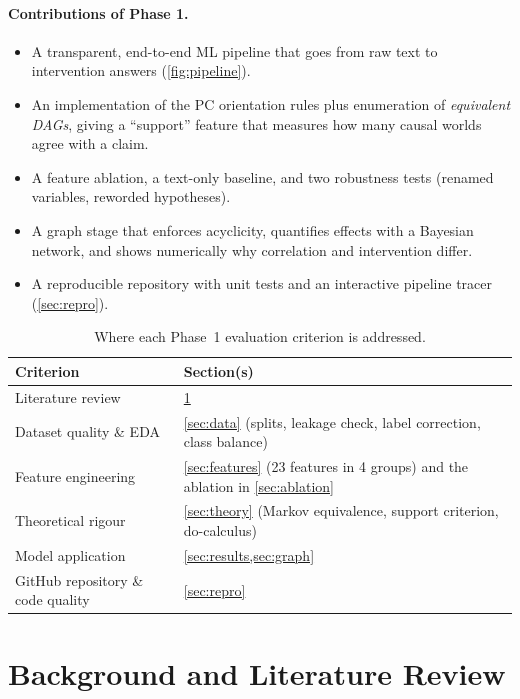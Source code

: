 \documentclass[12pt,a4paper]{article}
\newcommand{\thead}[1]{\textbf{#1}}
\begin{document}
\paragraph{Contributions of Phase 1.}
\begin{itemize}
  \item A transparent, end-to-end ML pipeline that goes from raw text to intervention answers (\cref{fig:pipeline}).
  \item An implementation of the PC orientation rules plus enumeration of \emph{equivalent DAGs}, giving a
        ``support'' feature that measures how many causal worlds agree with a claim.
  \item A feature ablation, a text-only baseline, and two robustness tests (renamed variables, reworded hypotheses).
  \item A graph stage that enforces acyclicity, quantifies effects with a Bayesian network, and shows numerically
        why correlation and intervention differ.
  \item A reproducible repository with unit tests and an interactive pipeline tracer (\cref{sec:repro}).
\end{itemize}

\begin{table}[!htbp]
\centering\small
\caption{Where each Phase~1 evaluation criterion is addressed.}
\label{tab:rubric}
\begin{tabularx}{0.92\linewidth}{@{}lX@{}}
\toprule
\thead{Criterion} & \thead{Section(s)} \\
\midrule
Literature review & \cref{sec:lit} \\
\rowcolor{rowtint} Dataset quality \& EDA & \cref{sec:data} (splits, leakage check, label correction, class balance) \\
Feature engineering & \cref{sec:features} (23 features in 4 groups) and the ablation in \cref{sec:ablation} \\
\rowcolor{rowtint} Theoretical rigour & \cref{sec:theory} (Markov equivalence, support criterion, do-calculus) \\
Model application & \cref{sec:results,sec:graph} \\
\rowcolor{rowtint} GitHub repository \& code quality & \cref{sec:repro} \\
\bottomrule
\end{tabularx}
\end{table}

\section{Background and Literature Review}\label{sec:lit}
\end{document}
